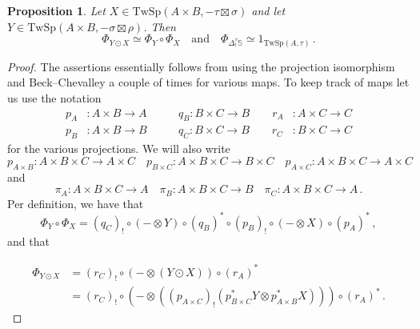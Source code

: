 \documentclass[10pt]{amsart}
\theoremstyle{plain}
\newtheorem{proposition}[theorem]{Proposition}
\theoremstyle{definition}
\newcommand{\bS}{\mathbb{S}}
\newcommand{\TwSp}{\mathrm{TwSp}}
\newcommand{\och}{\quad \text{and} \quad}
\begin{document}
\begin{proposition}
  Let $X \in \TwSp(A \times B , -\tau \boxtimes \sigma)$ and let $Y \in \TwSp(A \times B, -\sigma \boxtimes \rho)$. Then
  \[
  \Phi_{Y \odot X} \simeq \Phi_{Y} \circ \Phi_{X} \och \Phi_{\Delta^{\tau}_! \bS} \simeq 1_{\TwSp(A,\tau)} \,.
  \]
\end{proposition}

\begin{proof}
  The assertions essentially follows from using the projection isomorphism and Beck--Chevalley a couple of times for various maps.
  To keep track of maps let us use the notation
  \begin{equation*}
  \begin{aligned}
  p_A &: A \times B \to A \quad \quad  &q_B: B \times C \to B \quad \quad r_{A} &: A \times C \to C \\
  p_B &: A \times B \to B  \quad \quad &q_C: B\times C \to B \quad \quad  r_C &: B \times C \to C
  \end{aligned}
  \end{equation*}
  for the various projections. We will also write
  \[
  p_{A \times B} : A \times B \times C \to A \times C \quad p_{B \times C} : A \times B \times C \to B \times C \quad p_{A \times C} : A \times B \times C \to A \times C
  \]
  and
  \[
  \pi_{A} : A \times B \times C \to A \quad \pi_{B} : A \times B \times C \to B \quad \pi_{C} : A \times B \times C \to A \,.
  \]
  Per definition, we have that
  \[
  \Phi_Y \circ \Phi_X = (q_C)_! \circ (-\otimes Y) \circ (q_B)^* \circ (p_B)_! \circ (- \otimes X) \circ (p_A)^*  \,,
  \]
  and that

  \begin{align*}
  \Phi_{Y \odot X}& = (r_{C})_! \circ (- \otimes (Y \odot X)) \circ (r_A)^* \\
  &= (r_{C})_! \circ (- \otimes ((p_{A \times C})_!(p^*_{B \times C} Y \otimes p_{A \times B}^* X))) \circ (r_A)^* \,.
\end{align*}


\end{proof}
\end{document}
